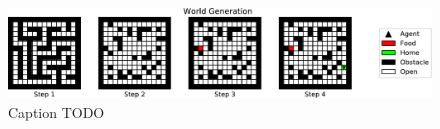 \begin{figure}
\begin{center}
\includegraphics[width=\textwidth]{img/world_explanatory}
\caption{
Caption TODO
}
\label{fig:world_explanatory}
\end{center}
\end{figure}
